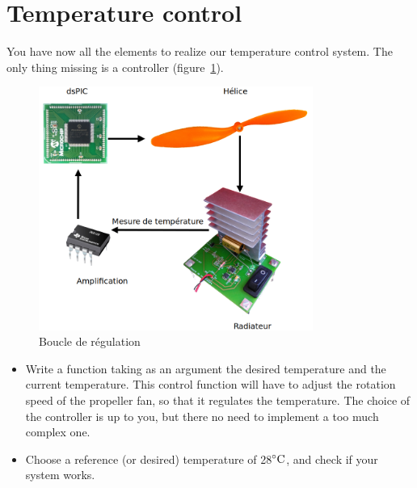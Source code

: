\documentclass[11pt,a4paper]{article}
\theoremstyle{definition}%
\begin{document}
\section{Temperature control}
You have now all the elements to realize our temperature control system.
The only thing missing is a controller (figure~\ref{fig:regulation}).

\begin{figure}[h]
\center
\includegraphics[width=0.8\textwidth]{regulation}
\caption{Boucle de régulation}
\label{fig:regulation}
\end{figure}

\begin{itemize}
	\item Write a function taking as an argument the desired temperature and the current temperature.
	This control function will have to adjust the rotation speed of the propeller fan, so that it regulates the temperature.
	The choice of the controller is up to you, but there no need to implement a too much complex one.
	\item Choose a reference (or desired) temperature of 28$\celsius$, and check if your system works.
\end{itemize}
\end{document}
